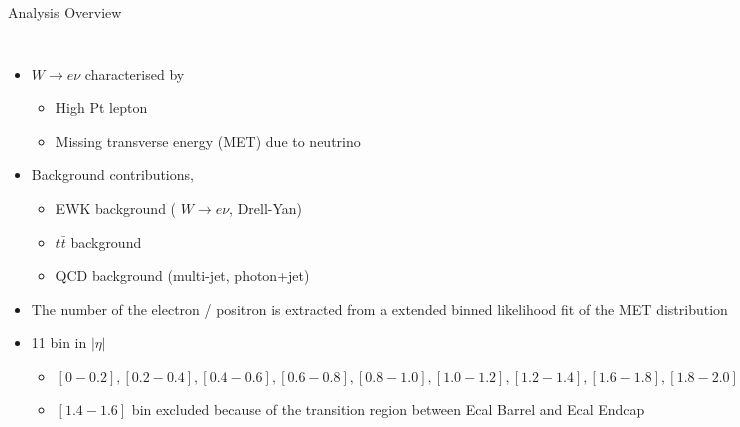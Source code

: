 \documentclass[t, 8pt]{beamer}
\begin{document}
\begin{frame}{Analysis Overview}
  \begin{columns}[c]
  \begin{itemize}
    \item $W \to e\nu$ characterised by 
    \begin{itemize}
      \item High Pt lepton 
      \item Missing transverse energy (MET) due to neutrino
    \end{itemize}
    \item Background contributions,
    \begin{itemize}
      \item EWK background ( $W \to e\nu$, Drell-Yan)
      \item $t\bar{t}$ background
      \item QCD background (multi-jet, photon+jet)
    \end{itemize}
    \item The number of the electron / positron is extracted from a extended binned likelihood fit of the MET distribution
    \item 11 bin in $|\eta|$
    \begin{itemize}
      \item  $[0-0.2], [0.2-0.4], [0.4-0.6],
      [0.6-0.8], [0.8-1.0], [1.0-1.2], [1.2-1.4], [1.6-1.8], [1.8-2.0],
      [2.0-2.2], [2.2-2.4]$
      \item $[1.4-1.6]$ bin excluded because of the transition region between Ecal Barrel and Ecal Endcap
    \end{itemize}
  \end{itemize}
  \end{columns}
\end{frame}
\end{document}
